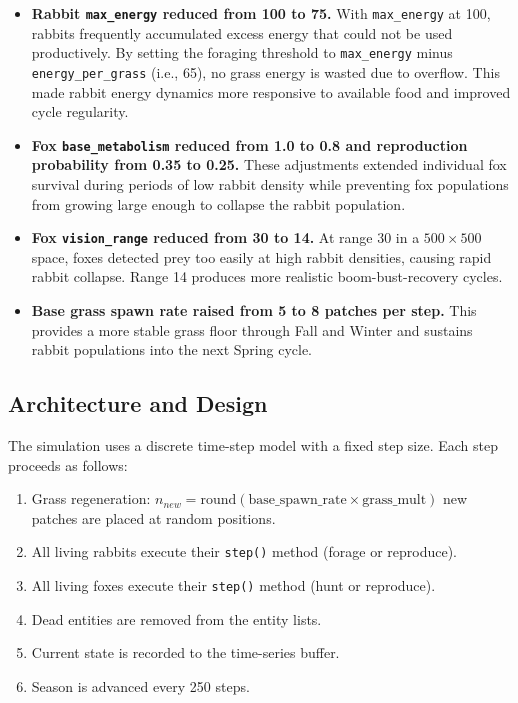 \documentclass[12pt]{article}
\begin{document}
\begin{itemize}
    \item \textbf{Rabbit \texttt{max\_energy} reduced from 100 to 75.} With
    \texttt{max\_energy} at 100, rabbits frequently accumulated excess energy
    that could not be used productively. By setting the foraging threshold to
    \texttt{max\_energy} minus \texttt{energy\_per\_grass} (i.e., 65), no grass
    energy is wasted due to overflow. This made rabbit energy dynamics more
    responsive to available food and improved cycle regularity.

    \item \textbf{Fox \texttt{base\_metabolism} reduced from 1.0 to 0.8 and
    reproduction probability from 0.35 to 0.25.} These adjustments extended
    individual fox survival during periods of low rabbit density while
    preventing fox populations from growing large enough to collapse the rabbit
    population.

    \item \textbf{Fox \texttt{vision\_range} reduced from 30 to 14.} At range
    30 in a $500 \times 500$ space, foxes detected prey too easily at high
    rabbit densities, causing rapid rabbit collapse. Range 14 produces more
    realistic boom-bust-recovery cycles.

    \item \textbf{Base grass spawn rate raised from 5 to 8 patches per step.}
    This provides a more stable grass floor through Fall and Winter and sustains
    rabbit populations into the next Spring cycle.
\end{itemize}

\subsection{Architecture and Design}

The simulation uses a discrete time-step model with a fixed step size. Each
step proceeds as follows:

\begin{enumerate}
    \item Grass regeneration: $n_{new} = \text{round}(\text{base\_spawn\_rate}
    \times \text{grass\_mult})$ new patches are placed at random positions.
    \item All living rabbits execute their \texttt{step()} method (forage or
    reproduce).
    \item All living foxes execute their \texttt{step()} method (hunt or
    reproduce).
    \item Dead entities are removed from the entity lists.
    \item Current state is recorded to the time-series buffer.
    \item Season is advanced every 250 steps.
\end{enumerate}
\end{document}
